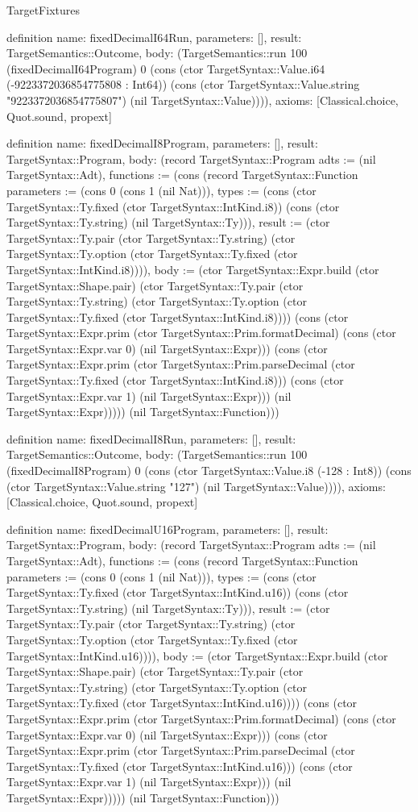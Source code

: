 \begin{lexlean}{TargetFixtures}
\begin{semanticmodule}
definition{
  name: fixedDecimalI64Run,
  parameters: [],
  result: TargetSemantics::Outcome,
  body: (TargetSemantics::run 100 (fixedDecimalI64Program) 0 (cons (ctor TargetSyntax::Value.i64 (-9223372036854775808 : Int64)) (cons (ctor TargetSyntax::Value.string "9223372036854775807") (nil TargetSyntax::Value)))),
  axioms: [Classical.choice, Quot.sound, propext]
}

definition{
  name: fixedDecimalI8Program,
  parameters: [],
  result: TargetSyntax::Program,
  body: (record TargetSyntax::Program {adts := (nil TargetSyntax::Adt), functions := (cons (record TargetSyntax::Function {parameters := (cons 0 (cons 1 (nil Nat))), types := (cons (ctor TargetSyntax::Ty.fixed (ctor TargetSyntax::IntKind.i8)) (cons (ctor TargetSyntax::Ty.string) (nil TargetSyntax::Ty))), result := (ctor TargetSyntax::Ty.pair (ctor TargetSyntax::Ty.string) (ctor TargetSyntax::Ty.option (ctor TargetSyntax::Ty.fixed (ctor TargetSyntax::IntKind.i8)))), body := (ctor TargetSyntax::Expr.build (ctor TargetSyntax::Shape.pair) (ctor TargetSyntax::Ty.pair (ctor TargetSyntax::Ty.string) (ctor TargetSyntax::Ty.option (ctor TargetSyntax::Ty.fixed (ctor TargetSyntax::IntKind.i8)))) (cons (ctor TargetSyntax::Expr.prim (ctor TargetSyntax::Prim.formatDecimal) (cons (ctor TargetSyntax::Expr.var 0) (nil TargetSyntax::Expr))) (cons (ctor TargetSyntax::Expr.prim (ctor TargetSyntax::Prim.parseDecimal (ctor TargetSyntax::Ty.fixed (ctor TargetSyntax::IntKind.i8))) (cons (ctor TargetSyntax::Expr.var 1) (nil TargetSyntax::Expr))) (nil TargetSyntax::Expr))))}) (nil TargetSyntax::Function))})
}

definition{
  name: fixedDecimalI8Run,
  parameters: [],
  result: TargetSemantics::Outcome,
  body: (TargetSemantics::run 100 (fixedDecimalI8Program) 0 (cons (ctor TargetSyntax::Value.i8 (-128 : Int8)) (cons (ctor TargetSyntax::Value.string "127") (nil TargetSyntax::Value)))),
  axioms: [Classical.choice, Quot.sound, propext]
}

definition{
  name: fixedDecimalU16Program,
  parameters: [],
  result: TargetSyntax::Program,
  body: (record TargetSyntax::Program {adts := (nil TargetSyntax::Adt), functions := (cons (record TargetSyntax::Function {parameters := (cons 0 (cons 1 (nil Nat))), types := (cons (ctor TargetSyntax::Ty.fixed (ctor TargetSyntax::IntKind.u16)) (cons (ctor TargetSyntax::Ty.string) (nil TargetSyntax::Ty))), result := (ctor TargetSyntax::Ty.pair (ctor TargetSyntax::Ty.string) (ctor TargetSyntax::Ty.option (ctor TargetSyntax::Ty.fixed (ctor TargetSyntax::IntKind.u16)))), body := (ctor TargetSyntax::Expr.build (ctor TargetSyntax::Shape.pair) (ctor TargetSyntax::Ty.pair (ctor TargetSyntax::Ty.string) (ctor TargetSyntax::Ty.option (ctor TargetSyntax::Ty.fixed (ctor TargetSyntax::IntKind.u16)))) (cons (ctor TargetSyntax::Expr.prim (ctor TargetSyntax::Prim.formatDecimal) (cons (ctor TargetSyntax::Expr.var 0) (nil TargetSyntax::Expr))) (cons (ctor TargetSyntax::Expr.prim (ctor TargetSyntax::Prim.parseDecimal (ctor TargetSyntax::Ty.fixed (ctor TargetSyntax::IntKind.u16))) (cons (ctor TargetSyntax::Expr.var 1) (nil TargetSyntax::Expr))) (nil TargetSyntax::Expr))))}) (nil TargetSyntax::Function))})
}


\end{semanticmodule}
\end{lexlean}
